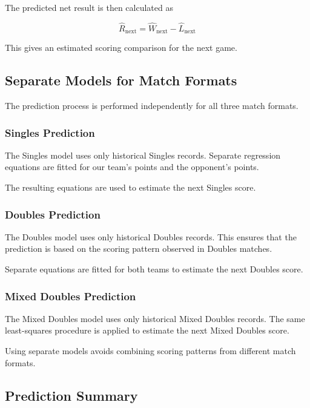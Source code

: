 The predicted net result is then calculated as

\[
\widehat{R}_{\text{next}}
=
\widehat{W}_{\text{next}}
-
\widehat{L}_{\text{next}}
\]

This gives an estimated scoring comparison for
the next game.

\subsection{Separate Models for Match Formats}

The prediction process is performed independently
for all three match formats.

\subsubsection{Singles Prediction}

The Singles model uses only historical Singles
records. Separate regression equations are fitted
for our team's points and the opponent's points.

The resulting equations are used to estimate the
next Singles score.

\subsubsection{Doubles Prediction}

The Doubles model uses only historical Doubles
records. This ensures that the prediction is based
on the scoring pattern observed in Doubles matches.

Separate equations are fitted for both teams to
estimate the next Doubles score.

\subsubsection{Mixed Doubles Prediction}

The Mixed Doubles model uses only historical Mixed
Doubles records. The same least-squares procedure
is applied to estimate the next Mixed Doubles score.

Using separate models avoids combining scoring
patterns from different match formats.

\subsection{Prediction Summary}


